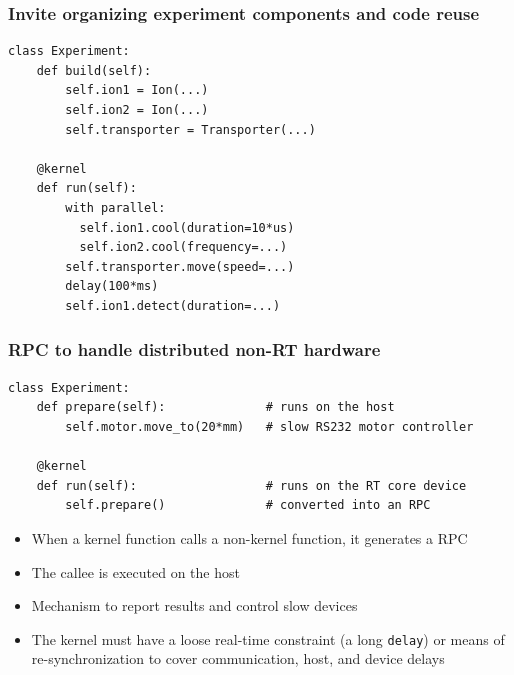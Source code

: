 \documentclass[final,presentation,compress]{beamer}
\begin{document}
\begin{frame}[fragile]
  \frametitle{Invite organizing experiment components and code reuse}
  \footnotesize

  \begin{verbatim}
class Experiment:
    def build(self):
        self.ion1 = Ion(...)
        self.ion2 = Ion(...)
        self.transporter = Transporter(...)

    @kernel
    def run(self):
        with parallel:
          self.ion1.cool(duration=10*us)
          self.ion2.cool(frequency=...)
        self.transporter.move(speed=...)
        delay(100*ms)
        self.ion1.detect(duration=...)
  \end{verbatim}
\end{frame}


\begin{frame}[fragile]
  \frametitle{RPC to handle distributed non-RT hardware}
  \footnotesize

  \begin{verbatim}
class Experiment:
    def prepare(self):              # runs on the host
        self.motor.move_to(20*mm)   # slow RS232 motor controller

    @kernel
    def run(self):                  # runs on the RT core device
        self.prepare()              # converted into an RPC
  \end{verbatim}

  \begin{itemize}
    \item When a kernel function calls a non-kernel function, it generates a RPC
    \item The callee is executed on the host
    \item Mechanism to report results and control slow devices
    \item The kernel must have a loose real-time constraint (a long \verb!delay!)
        or means of re-synchronization to cover communication, host, and device delays
  \end{itemize}
\end{frame}
\end{document}
